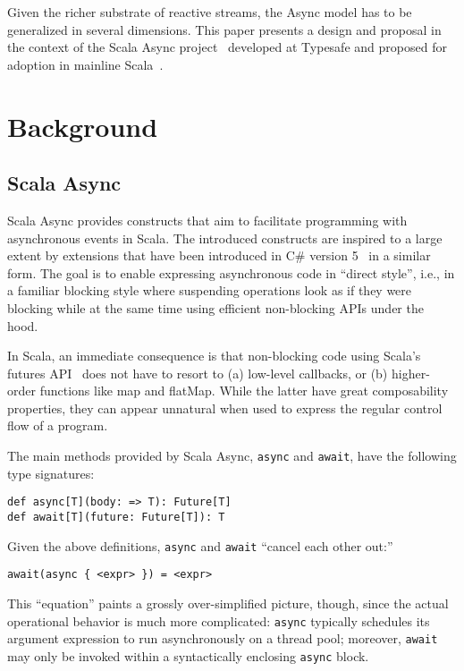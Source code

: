 \documentclass{acm_proc_article-sp}
\begin{document}
Given the richer substrate of reactive streams, the Async model has to be
generalized in several dimensions. This paper presents a design and proposal
in the context of the Scala Async project~\cite{ScalaAsync} developed at
Typesafe and proposed for adoption in mainline Scala~\cite{ScalaAsyncSIP}.

\section{Background}

\subsection{Scala Async}\label{sec:scala-async}

Scala Async provides constructs that aim to facilitate programming with
asynchronous events in Scala. The introduced constructs are inspired to a
large extent by extensions that have been introduced in C\# version 5~\cite{Hejlsberg:2011:CPL} in a
similar form. The goal is to enable expressing
asynchronous code in ``direct style'', i.e., in a familiar blocking style
where suspending operations look as if they were blocking while at the same
time using efficient non-blocking APIs under the hood.

In Scala, an immediate consequence is that non-blocking code using Scala's
futures API~\cite{ScalaFuturesSIP} does not have to resort to (a) low-level
callbacks, or (b) higher-order functions like map and flatMap. While the
latter have great composability properties, they can appear unnatural when
used to express the regular control flow of a program.

The main methods provided by Scala Async, \verb|async| and \verb|await|, have
the following type signatures:

\begin{lstlisting}
def async[T](body: => T): Future[T]
def await[T](future: Future[T]): T
\end{lstlisting}

Given the above definitions, \verb|async| and \verb|await| ``cancel each other
out:''

\begin{lstlisting}
await(async { <expr> }) = <expr>
\end{lstlisting}

This ``equation'' paints a grossly over-simplified picture, though, since the
actual operational behavior is much more complicated: \verb|async| typically
schedules its argument expression to run asynchronously on a thread pool;
moreover, \verb|await| may only be invoked within a syntactically enclosing
\verb|async| block.
\end{document}
